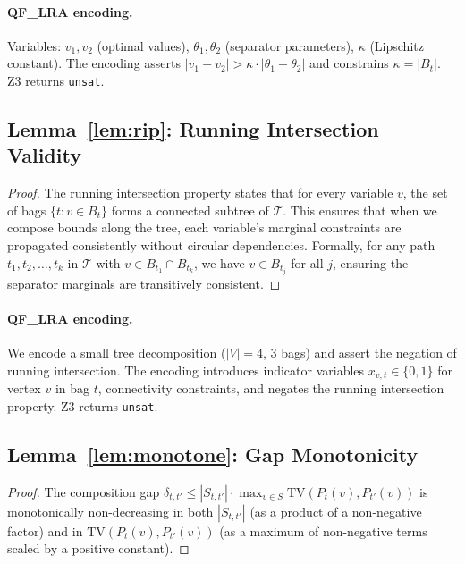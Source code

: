 \documentclass[11pt,a4paper]{article}
\newcommand{\calT}{\mathcal{T}}
\newcommand{\TV}{\mathrm{TV}}
\begin{document}
\paragraph{QF\_LRA encoding.} Variables: $v_1, v_2$ (optimal values), $\theta_1, \theta_2$ (separator parameters), $\kappa$ (Lipschitz constant). The encoding asserts $|v_1 - v_2| > \kappa \cdot |\theta_1 - \theta_2|$ and constrains $\kappa = |B_t|$. Z3 returns \texttt{unsat}.

\subsection{Lemma~\ref{lem:rip}: Running Intersection Validity}

\begin{proof}
The running intersection property states that for every variable $v$, the set of bags $\{t : v \in B_t\}$ forms a connected subtree of $\calT$. This ensures that when we compose bounds along the tree, each variable's marginal constraints are propagated consistently without circular dependencies. Formally, for any path $t_1, t_2, \ldots, t_k$ in $\calT$ with $v \in B_{t_1} \cap B_{t_k}$, we have $v \in B_{t_j}$ for all $j$, ensuring the separator marginals are transitively consistent.
\end{proof}

\paragraph{QF\_LRA encoding.} We encode a small tree decomposition ($|V| = 4$, 3 bags) and assert the negation of running intersection. The encoding introduces indicator variables $x_{v,t} \in \{0,1\}$ for vertex $v$ in bag $t$, connectivity constraints, and negates the running intersection property. Z3 returns \texttt{unsat}.

\subsection{Lemma~\ref{lem:monotone}: Gap Monotonicity}

\begin{proof}
The composition gap $\delta_{t,t'} \leq |S_{t,t'}| \cdot \max_{v \in S} \TV(P_t(v), P_{t'}(v))$ is monotonically non-decreasing in both $|S_{t,t'}|$ (as a product of a non-negative factor) and in $\TV(P_t(v), P_{t'}(v))$ (as a maximum of non-negative terms scaled by a positive constant).
\end{proof}
\end{document}
